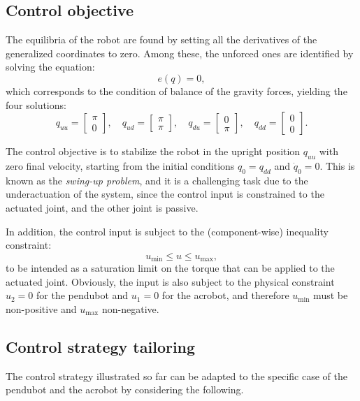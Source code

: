 \subsection{Control objective}
The equilibria of the robot are found by setting all the derivatives of the generalized coordinates to zero. Among these, the unforced ones are identified by solving the equation:
\begin{equation*}
    e(q) = 0,
\end{equation*}
which corresponds to the condition of balance of the gravity forces, yielding the four solutions:
\begin{equation*}
    q_{uu} = \begin{bmatrix} \pi \\ 0 \end{bmatrix}, \quad
    q_{ud} = \begin{bmatrix} \pi \\ \pi \end{bmatrix}, \quad
    q_{du} = \begin{bmatrix} 0 \\ \pi \end{bmatrix}, \quad
    q_{dd} = \begin{bmatrix} 0 \\ 0 \end{bmatrix}.
\end{equation*}

The control objective is to stabilize the robot in the upright position $q_{uu}$ with zero final velocity, starting from the initial conditions $q_0 = q_{dd}$ and $\dot{q}_0 = 0$. This is known as the \textit{swing-up problem}, and it is a challenging task due to the underactuation of the system, since the control input is constrained to the actuated joint, and the other joint is passive.

In addition, the control input is subject to the (component-wise) inequality constraint:
\begin{equation}
    u_{\text{min}} \leq u \leq u_{\text{max}}, \label{eq:input_constraints}
\end{equation}
to be intended as a saturation limit on the torque that can be applied to the actuated joint. Obviously, the input is also subject to the physical constraint $u_2 = 0$ for the pendubot and $u_1 = 0$ for the acrobot, and therefore $u_{\text{min}}$ must be non-positive and $u_{\text{max}}$ non-negative.

\subsection{Control strategy tailoring}
The control strategy illustrated so far can be adapted to the specific case of the pendubot and the acrobot by considering the following. 

